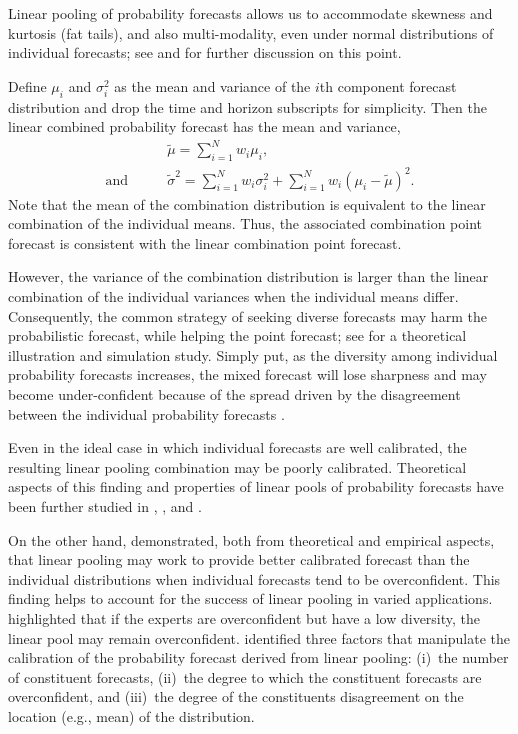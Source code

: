 \documentclass[11pt]{article}
\begin{document}
Linear pooling of probability forecasts allows us to accommodate skewness and kurtosis (fat tails), and also multi-modality, even under normal distributions of individual forecasts; see \citet{Wallis2005-yf} and \citet{Hall2007-lh} for further discussion on this point.

Define $\mu_{i}$ and $\sigma_{i}^{2}$ as the mean and variance of the $i$th component forecast distribution and drop the time and horizon subscripts for simplicity. Then the linear combined probability forecast has the mean and variance,
\begin{align}
   & \tilde{\mu} = \sum_{i=1}^{N} w_{i} \mu_{i}, \label{eq:mean_linear_pooling}  \\
  \text{and}\qquad
   & \tilde{\sigma}^{2} = \sum_{i=1}^{N} w_{i} \sigma_{i}^{2} + \sum_{i=1}^{N} w_{i} \left(\mu_{i}-\tilde{\mu}\right)^{2}. \label{eq:variance_linear_pooling}
\end{align}
Note that the mean of the combination distribution is equivalent to the linear combination of the individual means. Thus, the associated combination point forecast is consistent with the linear combination point forecast.

However, the variance of the combination distribution is larger than the linear combination of the individual variances when the individual means differ. Consequently, the common strategy of seeking diverse forecasts may harm the probabilistic forecast, while helping the point forecast; see \citet{Ranjan2010-jl} for a theoretical illustration and simulation study. Simply put, as the diversity among individual probability forecasts increases, the mixed forecast will lose sharpness and may become under-confident because of the spread driven by the disagreement between the individual probability forecasts \citep{Hora2004-fz,Wallis2005-yf,Ranjan2010-jl}.

Even in the ideal case in which individual forecasts are well calibrated, the resulting linear pooling combination may be poorly calibrated. Theoretical aspects of this finding and properties of linear pools of probability forecasts have been further studied in \citet{Hora2004-fz}, \citet{Ranjan2010-jl}, and \citet{Lichtendahl2013-rt}.

On the other hand, \citet{Hora2004-fz} demonstrated, both from theoretical and empirical aspects, that linear pooling may work to provide better calibrated forecast than the individual distributions when individual forecasts tend to be overconfident. This finding helps to account for the success of linear pooling in varied applications. \citet{Jose2014-uh} highlighted that if the experts are overconfident but have a low diversity, the linear pool may remain overconfident. \citet{Lichtendahl2013-rt} identified three factors that manipulate the calibration of the probability forecast derived from linear pooling: (i)~the number of constituent forecasts, (ii)~the degree to which the constituent forecasts are overconfident, and (iii)~the degree of the constituents disagreement on the location (e.g., mean) of the distribution.
\end{document}
